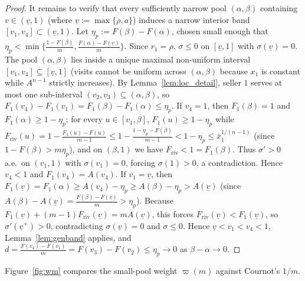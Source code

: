 \documentclass[12pt]{article}
\theoremstyle{mystyle}
\theoremstyle{mystyle2}
\newcommand{\1}{\mathbf{1}}
\begin{document}
\begin{proof}
It remains to verify that every sufficiently narrow pool $(\alpha,\beta)$ containing $v\in(\underline v,1)$ (where $\underline v:=\max\{\rho,a\}$) induces a narrow interior band $[v_1,v_4]\subset(\underline v,1)$. Let $\eta_p:=F(\beta)-F(\alpha)$, chosen small enough that $\eta_p<\min\{\frac{1-F(\beta)}{m},\frac{F(\alpha)-F(\underline v)}{m}\}$. Since $r_1=\rho$, $\sigma\le 0$ on $[\underline v,1]$ with $\sigma(\underline v)=0$. The pool $(\alpha,\beta)$ lies inside a unique maximal non-uniform interval $[v_1,v_4]\subseteq[\underline v,1]$ (visits cannot be uniform across $(\alpha,\beta)$ because $x_1$ is constant while $A^{n-1}$ strictly increases). By Lemma~\ref{lem:loc_detail}, seller $1$ serves at most one sub-interval $(v_2,v_3)\subseteq(\alpha,\beta)$, so $F_1(v_4)-F_1(v_1)=F_1(\beta)-F_1(\alpha)\le\eta_p$.
If $v_4=1$, then $F_1(\beta)=1$ and $F_1(\alpha)\ge 1-\eta_p$; for every $u\in[v_1,\beta]$, $F_1(u)\ge 1-\eta_p$ while $F_{\mathrm{riv}}(u)=1-\frac{F_1(u)-F(u)}{m-1}\le 1-\frac{1-\eta_p-F(\beta)}{m-1}<1-\eta_p\le\bar x_1^{1/(n-1)}$ (since $1-F(\beta)>m\eta_p$), and on $(\beta,1)$ we have $F_{\mathrm{riv}}<1=F_1(\beta)$. Thus $\sigma'>0$ a.e.\ on $(v_1,1)$ with $\sigma(v_1)=0$, forcing $\sigma(1)>0$, a contradiction. Hence $v_4<1$ and $F_1(v_4)=A(v_4)$.
If $v_1=\underline v$, then $F_1(\underline v)=F_1(\alpha)\ge A(v_4)-\eta_p\ge A(\beta)-\eta_p>A(\underline v)$ (since $A(\beta)-A(\underline v)=\frac{F(\beta)-F(\underline v)}{m}>\eta_p$). Because $F_1(\underline v)+(m-1)F_{\mathrm{riv}}(\underline v)=mA(\underline v)$, this forces $F_{\mathrm{riv}}(\underline v)<F_1(\underline v)$, so $\sigma'(\underline v^+)>0$, contradicting $\sigma(\underline v)=0$ and $\sigma\le 0$. Hence $\underline v<v_1<v_4<1$, Lemma~\ref{lem:genband} applies, and $d=\frac{F(v_4)-F(v_1)}{m}=F(v_3)-F(v_2)\le\eta_p\to 0$ as $\beta-\alpha\to 0$.
\end{proof}

Figure~\ref{fig:wm} compares the small-pool weight $\varpi(m)$ against Cournot's $1/m$.
\end{document}
